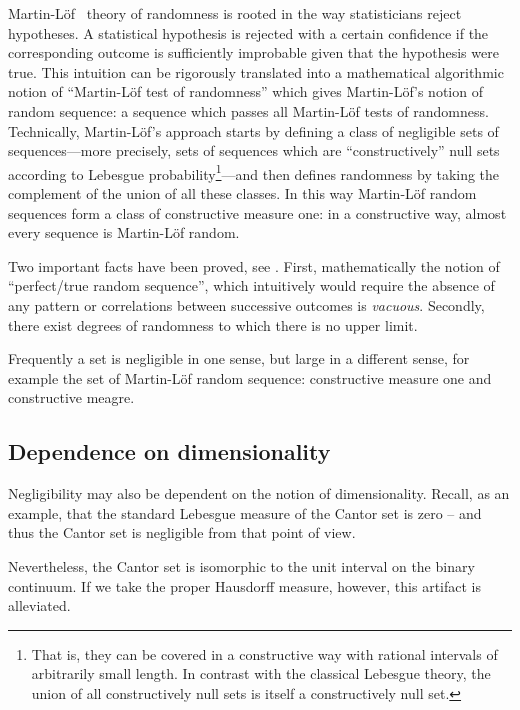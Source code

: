 \documentclass[11pt]{article}
\begin{document}
Martin-L\"of~\cite{martin-lof} theory of randomness is rooted in the way statisticians reject hypotheses. A statistical hypothesis is rejected with a certain confidence if the corresponding outcome is sufficiently improbable given that the hypothesis were true. This intuition can be rigorously translated into
a mathematical algorithmic notion of  ``Martin-L\"of test of randomness''  which gives Martin-L\"of's notion of random sequence: a sequence which passes all
Martin-L\"of tests of randomness. Technically, Martin-L\"of's approach starts by  defining a class of negligible sets of sequences---more precisely,  sets of sequences  which are ``constructively'' null sets according to Lebesgue probability\footnote{That is, they can be covered in a constructive way with rational intervals of arbitrarily small length. In contrast with the classical Lebesgue theory, the union of all constructively null sets is itself a constructively null set.}---and then defines  randomness by taking the complement of the union of all these classes. In this way Martin-L\"of random sequences form a class of constructive measure one: in a constructive  way, almost every sequence is Martin-L\"of random.


Two important  facts have been proved, see \cite{calude:02,DH}. First, mathematically the notion of ``perfect/true random sequence'', which intuitively would require the absence of any pattern or correlations between successive  outcomes is {\em vacuous}. Secondly,
there exist  degrees of randomness to which there is no upper limit.


Frequently a set is negligible in one sense, but large in a different sense, for example the set of Martin-L\"of random sequence: constructive measure one and constructive meagre.


\subsection{Dependence on dimensionality}

Negligibility may also be dependent on the notion of dimensionality.
Recall, as an example, that the standard Lebesgue measure of the Cantor set is zero -- and thus the Cantor set is negligible from that point of view.

Nevertheless, the Cantor set is isomorphic to the unit interval on the binary continuum.
If we take the proper Hausdorff measure, however, this artifact is alleviated.
\end{document}

